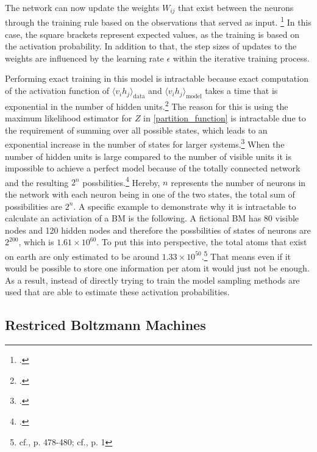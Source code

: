 The network can now update the weights \( W_{ij}\) that exist between the neurons through the training rule based on the observations that served as input. \footcite[cf.][1-2]{barraEquivalenceHopfieldNetworks2012}
In this case, the square brackets represent expected values, as the training is based on the activation probability.
In addition to that, the step sizes of updates to the weights are influenced by the learning rate \(\epsilon\) within the iterative training process.

Performing exact training in this model is intractable because exact computation of the activation function of \(\langle v_i h_j \rangle_{\text{data}}\) and \(\langle v_i h_j \rangle_{\text{model}}\) takes a time that is exponential in the number of hidden units.\footcite[cf.][449]{salakhutdinovDeepBoltzmannMachines2009}
The reason for this is using the maximum likelihood estimator for \( Z \) in \eqref{partition_function} is intractable due to the requirement of summing over all possible states, which leads to an exponential increase in the number of states for larger systems.\footcite[cf.][2-3]{zhaiDeepStructuredEnergy2016}
When the number of hidden units is large compared to the number of visible units it is impossible to achieve a perfect model because of the totally connected network and the resulting \( 2^n \) possbilities.\footcite[cf.][154]{ackleyLearningAlgorithmBoltzmann1985}
Hereby, \( n\) represents the number of neurons in the network with each neuron being in one of the two states, the total sum of possibilities are \( 2^n \).
A specific example to demonstrate why it is intractable to calculate an activiation of a \ac{BM} is the following. A fictional \ac{BM} has 80 visible nodes and 120 hidden nodes and therefore the possbilities of states of neurons are \( 2^{200} \), which is \( 1.61 \times 10^{60}\). 
To put this into perspective, the total atoms that exist on earth are only estimated to be around \( 1.33 \times 10^{50}\).\footnote{cf.\cite{helmenstineHowManyAtoms2022}, p. 478-480; cf.\cite{schlammingerCoolWayMeasure2014}, p. 1}
That means even if it would be possible to store one information per atom it would just not be enough. 
As a result, instead of directly trying to train the model sampling methods are used that are able to estimate these activation probabilities.

\subsection{Restriced Boltzmann Machines}

